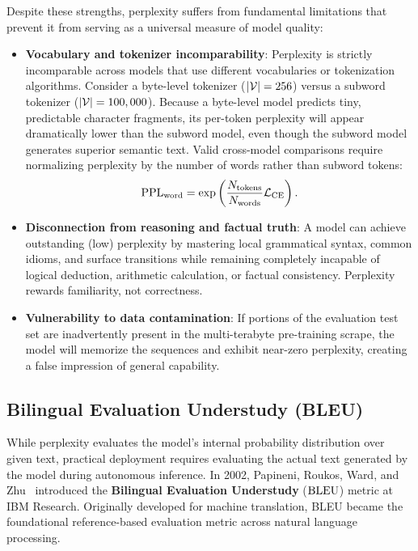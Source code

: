 \documentclass[../../main.tex]{subfiles}
\begin{document}
Despite these strengths, perplexity suffers from fundamental limitations that prevent it from serving as a universal measure of model quality:
\begin{itemize}
    \item \textbf{Vocabulary and tokenizer incomparability}: Perplexity is strictly incomparable across models that use different vocabularies or tokenization algorithms. Consider a byte-level tokenizer ($|\mathcal{V}| = 256$) versus a subword tokenizer ($|\mathcal{V}| = 100,000$). Because a byte-level model predicts tiny, predictable character fragments, its per-token perplexity will appear dramatically lower than the subword model, even though the subword model generates superior semantic text. Valid cross-model comparisons require normalizing perplexity by the number of words rather than subword tokens:
    \begin{equation}
    \label{eq:word_level_normalized_ppl}
    \mathrm{PPL}_{\text{word}} = \exp\left( \frac{N_{\text{tokens}}}{N_{\text{words}}} \mathcal{L}_{\text{CE}} \right).
    \end{equation}
    \item \textbf{Disconnection from reasoning and factual truth}: A model can achieve outstanding (low) perplexity by mastering local grammatical syntax, common idioms, and surface transitions while remaining completely incapable of logical deduction, arithmetic calculation, or factual consistency. Perplexity rewards familiarity, not correctness.
    \item \textbf{Vulnerability to data contamination}: If portions of the evaluation test set are inadvertently present in the multi-terabyte pre-training scrape, the model will memorize the sequences and exhibit near-zero perplexity, creating a false impression of general capability.
\end{itemize}

\subsection{Bilingual Evaluation Understudy (BLEU)}
\label{subsec:bleu}

While perplexity evaluates the model's internal probability distribution over given text, practical deployment requires evaluating the actual text generated by the model during autonomous inference. In 2002, Papineni, Roukos, Ward, and Zhu~\cite{papineni2002bleu} introduced the \textbf{Bilingual Evaluation Understudy} ($\mathrm{BLEU}$) metric at IBM Research. Originally developed for machine translation, BLEU became the foundational reference-based evaluation metric across natural language processing.
\end{document}
